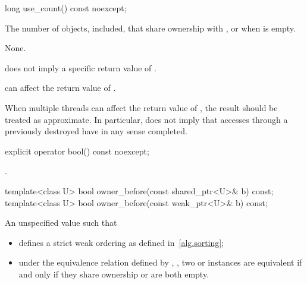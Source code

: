 %
\begin{itemdecl}
long use_count() const noexcept;
\end{itemdecl}

\begin{itemdescr}
\pnum\returns  The number of  objects,  included,
that share ownership with , or  when  is
empty.

\pnum\sync None.

\pnum \begin{note} 
does not imply a specific return value of . \end{note}

\pnum \begin{note} 
can affect the return value of . \end{note}

\pnum \begin{note} When multiple threads
can affect the return value of ,
the result should be treated as approximate.
In particular,  does not imply that accesses through
a previously destroyed  have in any sense completed. \end{note}
\end{itemdescr}

%
\begin{itemdecl}
explicit operator bool() const noexcept;
\end{itemdecl}

\begin{itemdescr}
\pnum\returns {}.
\end{itemdescr}

%
\begin{itemdecl}
template<class U> bool owner_before(const shared_ptr<U>& b) const;
template<class U> bool owner_before(const weak_ptr<U>& b) const;
\end{itemdecl}

\begin{itemdescr}
\pnum
\returns An unspecified value such that

\begin{itemize}
\item {} defines a strict weak ordering as defined in~\ref{alg.sorting};

\item under the equivalence relation defined by ,
, two  or
 instances are equivalent if and only if they share ownership or
are both empty.
\end{itemize}

\end{itemdescr}


